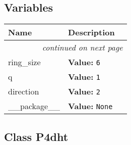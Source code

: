
  \subsection{Variables}

    \vspace{-1cm}
\hspace{\varindent}\begin{longtable}{|p{\varnamewidth}|p{\vardescrwidth}|l}
\cline{1-2}
\cline{1-2} \centering \textbf{Name} & \centering \textbf{Description}& \\
\cline{1-2}
\endhead\cline{1-2}\multicolumn{3}{r}{\small\textit{continued on next page}}\\\endfoot\cline{1-2}
\endlastfoot\raggedright r\-i\-n\-g\-\_\-s\-i\-z\-e\- & \raggedright \textbf{Value:} 
{\tt 6}&\\
\cline{1-2}
\raggedright q\- & \raggedright \textbf{Value:} 
{\tt 1}&\\
\cline{1-2}
\raggedright d\-i\-r\-e\-c\-t\-i\-o\-n\- & \raggedright \textbf{Value:} 
{\tt 2}&\\
\cline{1-2}
\raggedright \_\-\_\-p\-a\-c\-k\-a\-g\-e\-\_\-\_\- & \raggedright \textbf{Value:} 
{\tt None}&\\
\cline{1-2}
\end{longtable}



\subsection{Class P4dht}

